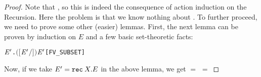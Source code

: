 \begin{proof}
\begin{alltt}
\end{alltt}
Note that , so
this is indeed the consequence of action induction on the Recursion.
Here the problem is that we know nothing about
. To further proceed, we need to prove
some other (easier) lemmas. First, the next lemma can be  proven
by  induction on $E$ and a few basic set-theoretic facts:
\begin{alltt}
\HOLTokenTurnstile{} \HOLSymConst{\HOLTokenForall{}}  \ensuremath{\HOLBoundVar{E}\sp{\prime}}.  \ensuremath{(}\ensuremath{[}\ensuremath{\HOLBoundVar{E}\sp{\prime}}\ensuremath{/}\ensuremath{]} \ensuremath{)} \HOLSymConst{\HOLTokenSubset{}}   \HOLSymConst{\HOLTokenUnion{}}  \ensuremath{\HOLBoundVar{E}\sp{\prime}}\hfill{[FV_SUBSET]}
\end{alltt}
Now, if we take $E' = {\tt rec}\: X . E$ in the above lemma, we get
 $=$  $=$

\end{proof}

